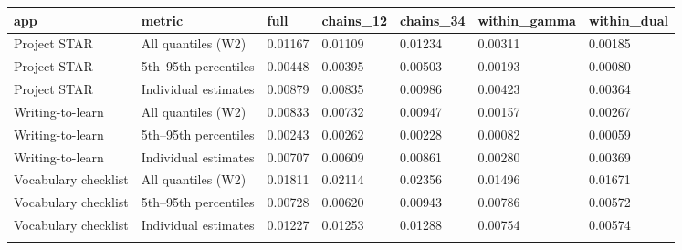 \begin{longtable}{lllllll}
\toprule
app & metric & full & chains\_12 & chains\_34 & within\_gamma & within\_dual \\
\midrule\endhead
Project STAR & All quantiles (W2) & 0.01167 & 0.01109 & 0.01234 & 0.00311 & 0.00185 \\ \addlinespace[3pt]
Project STAR & 5th–95th percentiles & 0.00448 & 0.00395 & 0.00503 & 0.00193 & 0.00080 \\ \addlinespace[3pt]
Project STAR & Individual estimates & 0.00879 & 0.00835 & 0.00986 & 0.00423 & 0.00364 \\ \addlinespace[3pt]
Writing-to-learn & All quantiles (W2) & 0.00833 & 0.00732 & 0.00947 & 0.00157 & 0.00267 \\ \addlinespace[3pt]
Writing-to-learn & 5th–95th percentiles & 0.00243 & 0.00262 & 0.00228 & 0.00082 & 0.00059 \\ \addlinespace[3pt]
Writing-to-learn & Individual estimates & 0.00707 & 0.00609 & 0.00861 & 0.00280 & 0.00369 \\ \addlinespace[3pt]
Vocabulary checklist & All quantiles (W2) & 0.01811 & 0.02114 & 0.02356 & 0.01496 & 0.01671 \\ \addlinespace[3pt]
Vocabulary checklist & 5th–95th percentiles & 0.00728 & 0.00620 & 0.00943 & 0.00786 & 0.00572 \\ \addlinespace[3pt]
Vocabulary checklist & Individual estimates & 0.01227 & 0.01253 & 0.01288 & 0.00754 & 0.00574 \\ \addlinespace[3pt]
\bottomrule\end{longtable}
